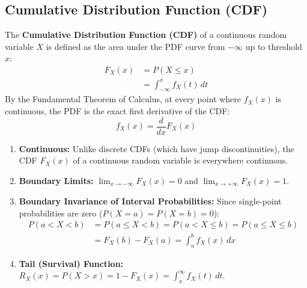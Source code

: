 \documentclass[12pt,a4paper]{article}
\begin{document}
\subsection{Cumulative Distribution Function (CDF)}
The \textbf{Cumulative Distribution Function (CDF)} of a continuous random variable $X$ is defined as the area under the PDF curve from $-\infty$ up to threshold $x$:
\begin{equation}
  \begin{aligned}
    F_X(x) &= P(X \le x) \\[3pt]
    &= \int_{-\infty}^x f_X(t) \, dt
  \end{aligned}
\end{equation}
By the Fundamental Theorem of Calculus, at every point where $f_X(x)$ is continuous, the PDF is the exact first derivative of the CDF:
\begin{equation}
  f_X(x) = \frac{d}{dx} F_X(x)
\end{equation}

\begin{tcolorbox}[formulabox, title={\textbf{Key Properties of Continuous CDF and Interval Probabilities}}]
\begin{enumerate}[leftmargin=*, itemsep=3pt]
  \item \textbf{Continuous:} Unlike discrete CDFs (which have jump discontinuities), the CDF $F_X(x)$ of a continuous random variable is everywhere continuous.
  \item \textbf{Boundary Limits:} $\displaystyle\lim_{x \to -\infty} F_X(x) = 0$ and $\displaystyle\lim_{x \to +\infty} F_X(x) = 1$.
  \item \textbf{Boundary Invariance of Interval Probabilities:} Since single-point probabilities are zero ($P(X = a) = P(X = b) = 0$):
  \begin{align}
    P(a < X < b) &= P(a \le X < b) = P(a < X \le b) = P(a \le X \le b) \nonumber \\[2pt]
                 &= F_X(b) - F_X(a) = \int_a^b f_X(x) \, dx
  \end{align}
  \item \textbf{Tail (Survival) Function:} $R_X(x) = P(X > x) = 1 - F_X(x) = \int_x^\infty f_X(t) \, dt$.
\end{enumerate}
\end{tcolorbox}
\end{document}
